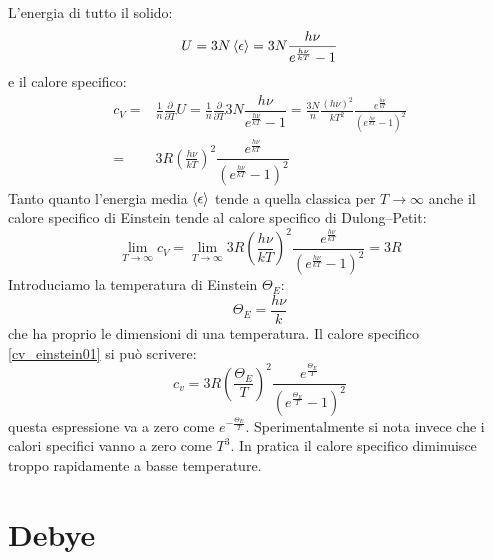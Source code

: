 L'energia di tutto il solido:
\begin{equation}
	U=3N\left<\epsilon\right>=3N\dfrac{h\nu}{e^{\frac{h\nu}{kT}}-1}
\end{equation}
e il calore specifico:
\begin{equation}
	\begin{split}
		c_V=&\frac{1}{n}\frac{\partial}{\partial T}U=\frac{1}{n}\frac{\partial}{\partial T}3N\dfrac{h\nu}{e^{\frac{h\nu}{kT}}-1}=
		\frac{3N}{n}\frac{(h\nu)^2}{kT^2}\frac{e^{\frac{h\nu}{kT}}}{\left(e^{\frac{h\nu}{kT}}-1\right)^2}\\=&3R\left(\frac{h\nu}{kT}\right)^2\dfrac{e^{\frac{h\nu}{kT}}}{\left(e^{\frac{h\nu}{kT}}-1\right)^2}
	\end{split}
	\label{cv_einstein01}
\end{equation}
Tanto quanto l'energia media $\left<\epsilon\right>$ tende a quella classica per $T\to\infty$ anche il calore specifico di Einstein tende al calore specifico di Dulong--Petit:
\begin{equation}
	\lim_{T\to\infty} c_V=\lim_{T\to\infty}3R\left(\frac{h\nu}{kT}\right)^2\dfrac{e^{\frac{h\nu}{kT}}}{\left(e^{\frac{h\nu}{kT}}-1\right)^2}=3R
\end{equation}
Introduciamo la temperatura di Einstein $\Theta_E$:
\begin{equation}
	\Theta_E=\frac{h\nu}{k}
\end{equation}
che ha proprio le dimensioni di una temperatura. Il calore specifico \eqref{cv_einstein01} si può scrivere:
\begin{equation}
	c_v=3R\left(\frac{\Theta_E}{T}\right)^2\dfrac{e^{\frac{\Theta_E}{T}}}{\left(e^{\frac{\Theta_E}{T}}-1\right)^2}
\end{equation}
questa espressione va a zero come $e^{-\frac{\Theta_E}{T}}$. Sperimentalmente si nota invece che i calori specifici vanno a zero come $T^3$. In pratica il calore specifico diminuisce troppo rapidamente a basse temperature.
\section{Debye}
